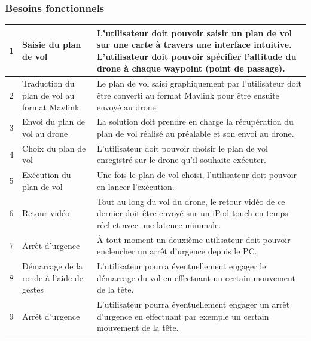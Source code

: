 \documentclass{article}
\begin{document}
\subsubsection{Besoins fonctionnels}
	    \begin{center}
	    \vspace*{0.7cm}
        \begin{tabularx}{15cm}{|c|p{4cm}|X|}
            \hline
            1 & Saisie du plan de vol & L'utilisateur doit pouvoir saisir un plan de vol sur une carte à travers une interface intuitive. L'utilisateur doit pouvoir spécifier l'altitude du drone à chaque waypoint (point de passage).\\
            \hline
            2 & Traduction du plan de vol au format Mavlink & Le plan de vol saisi graphiquement par l'utilisateur doit être converti au format Mavlink pour être ensuite envoyé au drone.\\
            \hline
            3 & Envoi du plan de vol au drone & La solution doit prendre en charge la récupération du plan de vol réalisé au préalable et son envoi au drone. \\
            \hline
            4 & Choix du plan de vol  & L'utilisateur doit pouvoir choisir le plan de vol enregistré sur le drone qu'il souhaite exécuter. \\
            \hline
            5 & Exécution du plan de vol  & Une fois le plan de vol choisi, l'utilisateur doit pouvoir en lancer l'exécution. \\
            \hline
            6 & Retour vidéo  & Tout au long du vol du drone, le retour vidéo de ce dernier doit être envoyé sur un iPod touch en temps réel et avec une latence minimale. \\
            \hline
            7 & Arrêt d'urgence  & À tout moment un deuxième utilisateur doit pouvoir enclencher un arrêt d'urgence depuis le PC. \\
            \hline
            8 & Démarrage de la ronde à l'aide de gestes & L'utilisateur pourra éventuellement engager le démarrage du vol en effectuant un certain mouvement de la tête. 	\\
			\hline
			9 & Arrêt d'urgence & L'utilisateur pourra éventuellement engager un arrêt d'urgence en effectuant par exemple un certain mouvement de la tête. 	\\
			\hline
        \end{tabularx}
        \end{center}
\end{document}
